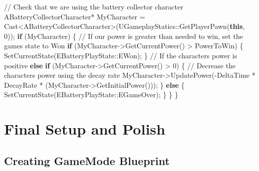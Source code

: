 \documentclass[
  letterpaper,
  DIV=11,
  numbers=noendperiod]{scrartcl}
\newenvironment{Shaded}{\begin{snugshade}}{\end{snugshade}}
\newcommand{\CommentTok}[1]{\textcolor[rgb]{0.37,0.37,0.37}{#1}}
\newcommand{\ControlFlowTok}[1]{\textcolor[rgb]{0.00,0.23,0.31}{\textbf{#1}}}
\newcommand{\DecValTok}[1]{\textcolor[rgb]{0.68,0.00,0.00}{#1}}
\newcommand{\KeywordTok}[1]{\textcolor[rgb]{0.00,0.23,0.31}{\textbf{#1}}}
\newcommand{\NormalTok}[1]{\textcolor[rgb]{0.00,0.23,0.31}{#1}}
\newcommand{\OperatorTok}[1]{\textcolor[rgb]{0.37,0.37,0.37}{#1}}
\begin{document}
\begin{Shaded}
\begin{Highlighting}[]
    \CommentTok{// Check that we are using the battery collector character }
\NormalTok{    ABatteryCollectorCharacter}\OperatorTok{*}\NormalTok{ MyCharacter }\OperatorTok{=}\NormalTok{ Cast}\OperatorTok{\textless{}}\NormalTok{ABatteryCollectorCharacter}\OperatorTok{\textgreater{}(}\NormalTok{UGameplayStatics}\OperatorTok{::}\NormalTok{GetPlayerPawn}\OperatorTok{(}\KeywordTok{this}\OperatorTok{,} \DecValTok{0}\OperatorTok{));}
    \ControlFlowTok{if} \OperatorTok{(}\NormalTok{MyCharacter}\OperatorTok{)}
    \OperatorTok{\{}
        \CommentTok{// If our power is greater than needed to win, set the game\textquotesingle{}s state to Won}
        \ControlFlowTok{if} \OperatorTok{(}\NormalTok{MyCharacter}\OperatorTok{{-}\textgreater{}}\NormalTok{GetCurrentPower}\OperatorTok{()} \OperatorTok{\textgreater{}}\NormalTok{ PowerToWin}\OperatorTok{)}
        \OperatorTok{\{}
\NormalTok{            SetCurrentState}\OperatorTok{(}\NormalTok{EBatteryPlayState}\OperatorTok{::}\NormalTok{EWon}\OperatorTok{);}
        \OperatorTok{\}}
        \CommentTok{// If the character\textquotesingle{}s power is positive}
        \ControlFlowTok{else} \ControlFlowTok{if} \OperatorTok{(}\NormalTok{MyCharacter}\OperatorTok{{-}\textgreater{}}\NormalTok{GetCurrentPower}\OperatorTok{()} \OperatorTok{\textgreater{}} \DecValTok{0}\OperatorTok{)}
        \OperatorTok{\{}
            \CommentTok{// Decrease the character\textquotesingle{}s power using the decay rate}
\NormalTok{            MyCharacter}\OperatorTok{{-}\textgreater{}}\NormalTok{UpdatePower}\OperatorTok{({-}}\NormalTok{DeltaTime }\OperatorTok{*}\NormalTok{ DecayRate }\OperatorTok{*} \OperatorTok{(}\NormalTok{MyCharacter}\OperatorTok{{-}\textgreater{}}\NormalTok{GetInitialPower}\OperatorTok{()));}
        \OperatorTok{\}}
        \ControlFlowTok{else}
        \OperatorTok{\{}
\NormalTok{            SetCurrentState}\OperatorTok{(}\NormalTok{EBatteryPlayState}\OperatorTok{::}\NormalTok{EGameOver}\OperatorTok{);}
        \OperatorTok{\}}
    \OperatorTok{\}}
\OperatorTok{\}}
\end{Highlighting}
\end{Shaded}

\section{Final Setup and Polish}\label{final-setup-and-polish}

\subsection{Creating GameMode
Blueprint}\label{creating-gamemode-blueprint}
\end{document}
